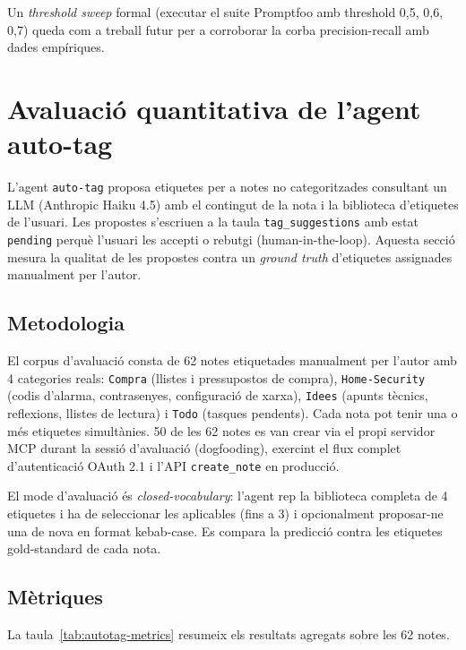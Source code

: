 Un \emph{threshold sweep} formal (executar el suite Promptfoo amb threshold 0{,}5, 0{,}6, 0{,}7) queda com a treball futur per a corroborar la corba precision-recall amb dades empíriques.

\section{Avaluació quantitativa de l'agent auto-tag}
\label{sec:eval-auto-tag}

L'agent \texttt{auto-tag} proposa etiquetes per a notes no categoritzades consultant un LLM (Anthropic Haiku 4.5) amb el contingut de la nota i la biblioteca d'etiquetes de l'usuari. Les propostes s'escriuen a la taula \texttt{tag\_suggestions} amb estat \texttt{pending} perquè l'usuari les accepti o rebutgi (human-in-the-loop). Aquesta secció mesura la qualitat de les propostes contra un \emph{ground truth} d'etiquetes assignades manualment per l'autor.

\subsection{Metodologia}

El corpus d'avaluació consta de 62 notes etiquetades manualment per l'autor amb 4 categories reals: \texttt{Compra} (llistes i pressupostos de compra), \texttt{Home-Security} (codis d'alarma, contrasenyes, configuració de xarxa), \texttt{Idees} (apunts tècnics, reflexions, llistes de lectura) i \texttt{Todo} (tasques pendents). Cada nota pot tenir una o més etiquetes simultànies. 50 de les 62 notes es van crear via el propi servidor MCP durant la sessió d'avaluació (dogfooding), exercint el flux complet d'autenticació OAuth 2.1 i l'API \texttt{create\_note} en producció.

El mode d'avaluació és \emph{closed-vocabulary}: l'agent rep la biblioteca completa de 4 etiquetes i ha de seleccionar les aplicables (fins a 3) i opcionalment proposar-ne una de nova en format kebab-case. Es compara la predicció contra les etiquetes gold-standard de cada nota.

\subsection{Mètriques}

La taula~\ref{tab:autotag-metrics} resumeix els resultats agregats sobre les 62 notes.

